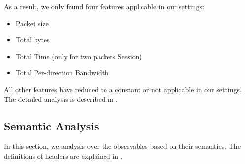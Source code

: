 As a result, we only found four features applicable in our settings:
\begin{itemize}
	\item Packet size
	\item Total bytes
	\item Total Time (only for two packets Session)
	\item Total Per-direction Bandwidth
\end{itemize}

All other features have reduced to a constant or not applicable in our settings. The detailed analysis is described in .

\subsection{Semantic Analysis}

In this section, we analysis over the observables based on their semantics. The definitions of headers are explained in .




